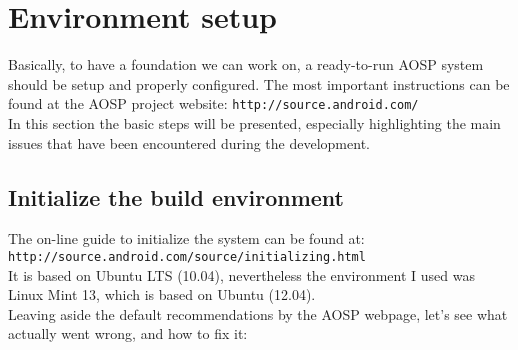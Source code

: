 \section{Environment setup}
\label{setup}
Basically, to have a foundation we can work on, a ready-to-run AOSP system should be setup and properly configured. The most important instructions can be found at the AOSP project website: \texttt{http://source.android.com/}\\
In this section the basic steps will be presented, especially highlighting the main issues that have been encountered during the development.
\subsection{Initialize the build environment}
The on-line guide to initialize the system can be found at:\\
\texttt{http://source.android.com/source/initializing.html}\\
It is based on Ubuntu LTS (10.04), nevertheless the environment I used was Linux Mint 13, which is based on Ubuntu (12.04).\\
Leaving aside the default recommendations by the AOSP webpage, let's see what actually went wrong, and how to fix it:
